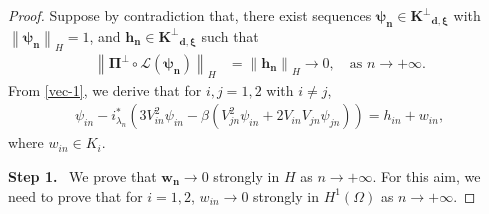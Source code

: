 \documentclass[10pt,a4paper]{amsart}
\begin{document}
\begin{proof} Suppose by contradiction that, there exist sequences $\bm{\psi_{{n}}} \in \bm{K^{\perp}}_{\bm{d},\bm{\xi}}$ with $\left\|{\bm{\psi_{{n}}}}\right\|_{H}=1$, and $\bm{h_n}\in\bm{K^{\perp}}_{\bm{d},\bm{\xi}}$ such that   
    \begin{align*}
\left\|\bm\Pi^{\perp}\circ\bm{\mathcal{L}}(\bm{\psi_n})\right\|_{H}&=\left\|\bm{{h}_{n}}\right\|_{H} \rightarrow 0,\quad\text{as $n\rightarrow +\infty$}.
    \end{align*}
From \eqref{vec-1}, we derive that for $i,j=1,2$ with $i\neq j$,
\begin{align}\label{new-psi}
   \psi_{in}-i_{\lambda_n}^{*}\left(3V_{in}^2\psi_{in}-\beta\left(V_{jn}^2\psi_{in}+2V_{in}V_{jn}\psi_{jn}\right)\right)=h_{in}+w_{in},
\end{align}
where $w_{{in}} \in K_i$.


\medskip
\textbf{Step 1.}~ We prove that $\bm{w_{{n}}} \rightarrow 0$ strongly in $H$ as $n \rightarrow+\infty$. For this aim, we need to prove that for $i=1,2$, $w_{in}\rightarrow 0$  strongly in $H^1(\Omega)$ as $n \rightarrow+\infty$. 


\end{proof}
\end{document}
